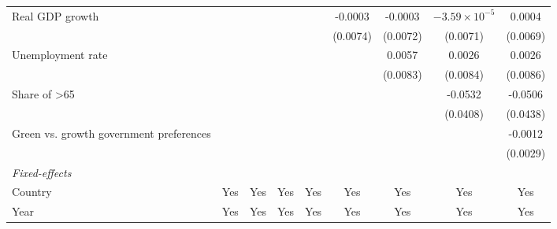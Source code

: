 \begin{table}[htbp]
\begin{tabular}{lcccccccc}
      Real GDP growth                                                         &          &          &                &                 & -0.0003         & -0.0003         & $-3.59\times 10^{-5}$  & 0.0004\\   
                                                                              &          &          &                &                 & (0.0074)        & (0.0072)        & (0.0071)               & (0.0069)\\   
      Unemployment rate                                                       &          &          &                &                 &                 & 0.0057          & 0.0026                 & 0.0026\\   
                                                                              &          &          &                &                 &                 & (0.0083)        & (0.0084)               & (0.0086)\\   
      Share of >65                                                            &          &          &                &                 &                 &                 & -0.0532                & -0.0506\\   
                                                                              &          &          &                &                 &                 &                 & (0.0408)               & (0.0438)\\   
      Green vs. growth government preferences                                 &          &          &                &                 &                 &                 &                        & -0.0012\\   
                                                                              &          &          &                &                 &                 &                 &                        & (0.0029)\\   
      \midrule
      \emph{Fixed-effects}\\
      Country                                                                 & Yes      & Yes      & Yes            & Yes             & Yes             & Yes             & Yes                    & Yes\\  
      Year                                                                    & Yes      & Yes      & Yes            & Yes             & Yes             & Yes             & Yes                    & Yes\\  
      \midrule

\end{tabular}
\end{table}
